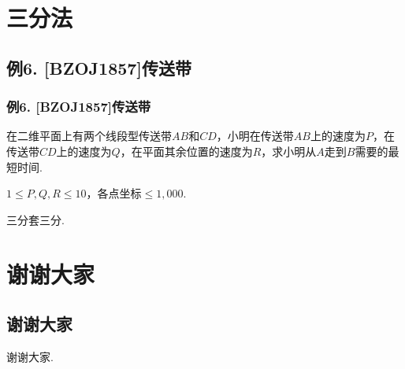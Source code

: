 \documentclass{beamer}
\def\leq{\leqslant}
\def\dou{，\!\!}
\begin{document}
    \section{三分法}

    \subsection{例6. [BZOJ1857]传送带}

    \begin{frame}
        \frametitle{例6. [BZOJ1857]传送带}
        \begin{block}

            在二维平面上有两个线段型传送带$AB$和$CD$\dou 小明在传送带$AB$上的速度为$P$\dou 在传送带$CD$上的速度为$Q$\dou 在平面其余位置的速度为$R$\dou 求小明从$A$走到$B$需要的最短时间.\pause

            $1\leq P,Q,R\leq 10$\dou 各点坐标$\leq 1,000$.\pause
        \end{block}

        三分套三分.
    \end{frame}

    \section*{谢谢大家}

    \subsection*{谢谢大家}
    
    \begin{frame}[fragile]
        谢谢大家.
    \end{frame}
\end{document}
